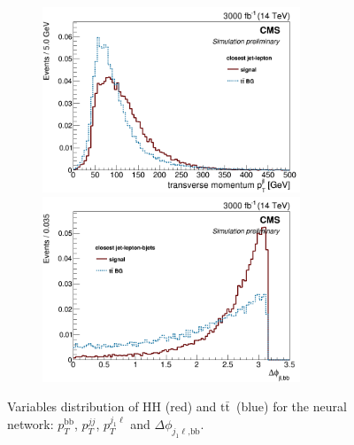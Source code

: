 \documentclass[10pt,a4paper]{article}
\newcommand{\ww}{7.7cm} %
\newcommand{\dd}{-2mm} %
\renewcommand{\tt}{$\text{t}\bar{\text{t}}$}
\begin{document}
\begin{figure}[h]
  \begin{subfigure}[b]{17cm}
    \begin{minipage}[h!]{\ww}
      \centering
      \includegraphics[width=\ww]{figs/Pt_j1l.png}
    \end{minipage}
    \begin{minipage}[h!]{\ww}
      \centering
      \includegraphics[width=\ww]{figs/DeltaPhi_j1lbb.png}
    \end{minipage}
    \hspace{9mm}
  \end{subfigure}	
  \vspace{\dd}
  \caption{Variables distribution of HH (red) and \tt\ (blue) for the neural network: $p_T^\text{bb}$, $p_T^{jj}$, $p_T^{j_1\ell}$ and $\Delta\phi_{j_1\ell\text{,bb}}$.} \label{vars4}

\end{figure}
\end{document}
